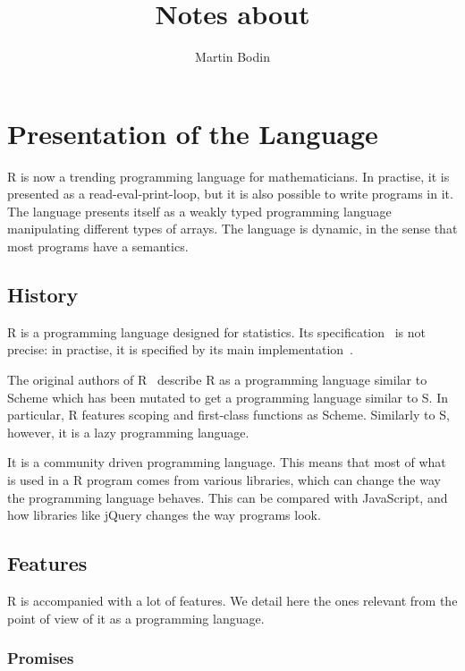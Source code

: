 \documentclass{article}
\title{Notes about \R}
\author{Martin Bodin}
\newcommand\R{R}
\newcommand\Cn{C}
\begin{document}
\maketitle

\section{Presentation of the Language}

\R{} is now a trending programming language for mathematicians.
In practise, it is presented as a read-eval-print-loop,
but it is also possible to write programs in it.
The language presents itself as a weakly typed programming language
manipulating different types of arrays.
The language is dynamic,
in the sense that most programs have a semantics.

\subsection{History}

\R{} is a programming language designed for statistics.
Its specification~\parencite{team2000r} is not precise:
in practise, it is specified by its main implementation~\parencite{Rwebsite}.

The original authors of \R{}~\parencite{ihaka1996r}
describe \R{} as a programming language similar to Scheme
which has been mutated to get a programming language similar to S.
In particular, \R{} features scoping and first-class functions
as Scheme.
Similarly to S, however, it is a lazy programming language.

It is a community driven programming language.
This means that most of what is used in a \R{} program comes from various libraries,
which can change the way the programming language behaves.
This can be compared with JavaScript,
and how libraries like jQuery changes the way programs look.

\subsection{Features}

\R{} is accompanied with a lot of features.
We detail here the ones relevant from the point of view
of it as a programming language.

\subsubsection{Promises}
\label{sec:promises}
\end{document}
